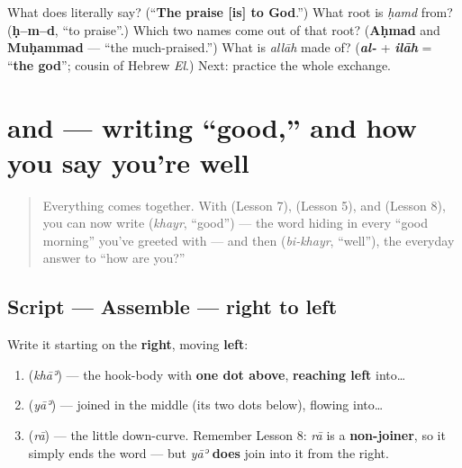 \begin{tcolorbox}[breakable,colback=teal!4,colframe=teal!35!black,title={Before you move on}]
What does \textbf{ } literally say? (\textquotedblleft{}\textbf{The praise {[}is{]} to God}.\textquotedblright{}) What root is \emph{ḥamd} from? (\textbf{ḥ–m–d}, \textquotedblleft{}to praise\textquotedblright{}.) Which two names come out of that root? (\textbf{Aḥmad} and \textbf{Muḥammad} — \textquotedblleft{}the much-praised.\textquotedblright{}) What is \emph{allāh} made of? (\emph{\textbf{al-}} + \emph{\textbf{ilāh}} = \textquotedblleft{}\textbf{the god}\textquotedblright{}; cousin of Hebrew \emph{El}.) Next: practice the whole exchange.
\end{tcolorbox}
\section[\texorpdfstring{\ar{خير} (khayr, bi-khayr)}{خير (khayr, bi-khayr)}]{ and  — writing \textquotedblleft{}good,\textquotedblright{} and how you say you're well}

\label{lesson:AR-W09-khayr-bikhayr}



\begin{quote}
Everything comes together. With \textbf{} (Lesson 7), \textbf{} (Lesson 5), and \textbf{} (Lesson 8), you can now write \textbf{} (\emph{khayr}, \textquotedblleft{}good\textquotedblright{}) — the word hiding in every \textquotedblleft{}good morning\textquotedblright{} you've greeted with — and then \textbf{} (\emph{bi-khayr}, \textquotedblleft{}well\textquotedblright{}), the everyday answer to \textquotedblleft{}how are you?\textquotedblright{}
\end{quote}

\subsection*{Script — Assemble  — right to left}
Write it starting on the \textbf{right}, moving \textbf{left}:

\begin{enumerate}
\raggedright
  \item \textbf{} (\emph{khāʾ}) — the hook-body with \textbf{one dot above}, \textbf{reaching left} into…
  \item \textbf{} (\emph{yāʾ}) — joined in the middle (its two dots below), flowing into…
  \item \textbf{} (\emph{rā}) — the little down-curve. Remember Lesson 8: \emph{rā} is a \textbf{non-joiner}, so it simply ends the word — but \emph{yāʾ} \textbf{does} join into it from the right.
\end{enumerate}

